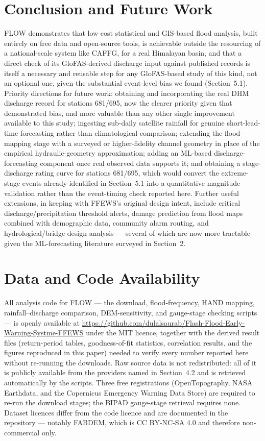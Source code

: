 \documentclass[11pt]{article}
\begin{document}
\section{Conclusion and Future Work}

FLOW demonstrates that low-cost statistical and GIS-based flood analysis, built entirely on free data and open-source tools, is achievable outside the resourcing of a national-scale system like CAFFG, for a real Himalayan basin, and that a direct check of its GloFAS-derived discharge input against published records is itself a necessary and reusable step for any GloFAS-based study of this kind, not an optional one, given the substantial event-level bias we found (Section~5.1). Priority directions for future work: obtaining and incorporating the real DHM discharge record for stations 681/695, now the clearer priority given that demonstrated bias, and more valuable than any other single improvement available to this study; ingesting sub-daily satellite rainfall for genuine short-lead-time forecasting rather than climatological comparison; extending the flood-mapping stage with a surveyed or higher-fidelity channel geometry in place of the empirical hydraulic-geometry approximation; adding an ML-based discharge-forecasting component once real observed data supports it; and obtaining a stage-discharge rating curve for stations 681/695, which would convert the extreme-stage events already identified in Section~5.1 into a quantitative magnitude validation rather than the event-timing check reported here. Further useful extensions, in keeping with FFEWS's original design intent, include critical discharge/precipitation threshold alerts, damage prediction from flood maps combined with demographic data, community alarm routing, and hydrological/bridge design analysis --- several of which are now more tractable given the ML-forecasting literature surveyed in Section~2.

\section*{Data and Code Availability}

All analysis code for FLOW --- the download, flood-frequency, HAND mapping,
rainfall--discharge comparison, DEM-sensitivity, and gauge-stage checking
scripts --- is openly available at
\url{https://github.com/dulalsaurab/Flash-Flood-Early-Warning-Systme-FFEWS}
under the MIT licence, together with the derived result files (return-period
tables, goodness-of-fit statistics, correlation results, and the figures
reproduced in this paper) needed to verify every number reported here without
re-running the downloads. Raw source data is not redistributed: all of it is
publicly available from the providers named in Section~4.2 and is retrieved
automatically by the scripts. Three free registrations (OpenTopography, NASA
Earthdata, and the Copernicus Emergency Warning Data Store) are required to
re-run the download stages; the BIPAD gauge-stage retrieval requires none.
Dataset licences differ from the code licence and are documented in the
repository --- notably FABDEM, which is CC BY-NC-SA 4.0 and therefore
non-commercial only.
\end{document}
